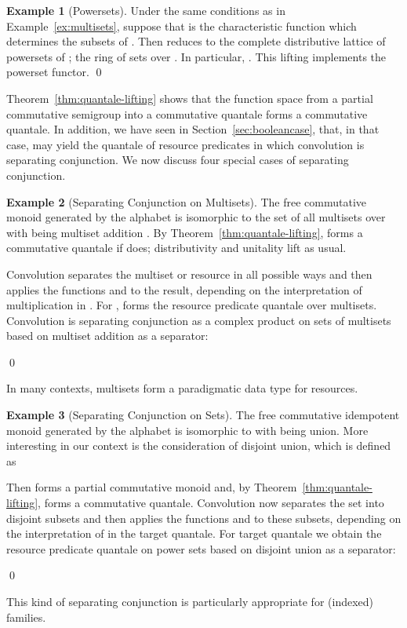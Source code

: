 \documentclass[12pt]{article}
\theoremstyle{definition}
\newtheorem{example}{Example}
\begin{document}
\begin{example}[Powersets]\label{ex:powersets}
  Under the same conditions as in Example~\ref{ex:multisets}, suppose
  that  is the characteristic function which
  determines the subsets of . Then  reduces
  to the complete distributive lattice of powersets of ; the ring
  of sets over . In particular, . This
  lifting implements the powerset functor. \qed
\end{example}

Theorem~\ref{thm:quantale-lifting} shows that the function space 
from a partial commutative semigroup  into a commutative quantale
 forms a commutative quantale. In addition, we have seen in
Section~\ref{sec:booleancase}, that, in that case,  may
yield the quantale of resource predicates in which convolution is
separating conjunction. We now discuss four special cases of
separating conjunction.

\begin{example}[Separating Conjunction on Multisets]\label{ex:separating-conjunction-ms}
  The free commutative monoid  generated by the
  alphabet  is isomorphic to the set of all multisets over 
  with  being multiset addition . By
  Theorem~\ref{thm:quantale-lifting},  forms a
  commutative quantale if  does; distributivity and unitality lift
  as usual.

  Convolution  separates
  the multiset or resource  in all possible ways and then applies
  the functions  and  to the result, depending on the
  interpretation of multiplication in . For ,
   forms the resource predicate quantale over
  multisets. Convolution  is separating conjunction as a
  complex product on sets
  of multisets based on multiset addition as a separator:
  
  \qed
\end{example}
In many contexts, multisets form a paradigmatic data type for resources.

\begin{example}[Separating Conjunction on Sets]\label{ex:separating-conjunction-sets}
  The free commutative idempotent monoid  generated
  by the alphabet  is isomorphic to  with  being
  union. More interesting in our context is the consideration of
  disjoint union, which is defined as
  
  Then  forms a partial commutative monoid
  and, by Theorem~\ref{thm:quantale-lifting},  forms a
  commutative quantale.  Convolution  now separates the
  set  into disjoint subsets and then applies the functions  and
   to these subsets, depending on the interpretation of  in
  the target quantale.  For target quantale  we obtain the
  resource predicate quantale  on power sets
  based on disjoint union as a separator:
  
\qed
\end{example}
This kind of separating conjunction is particularly appropriate for
(indexed) families.
\end{document}
